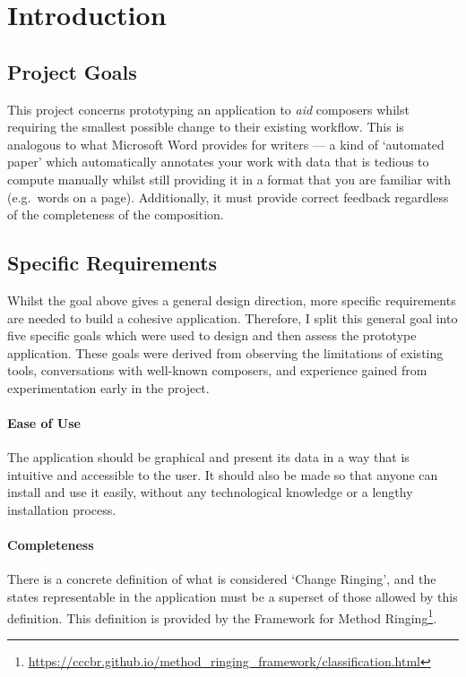 \documentclass[12pt]{article}
\newcommand{\footurl}[1]{\footnote{\url{#1}}}
\begin{document}
\pagebreak

\section{Introduction}

\subsection{Project Goals}\label{sec:design-goals}

This project concerns prototyping an application to \emph{aid} composers whilst requiring the
smallest possible change to their existing workflow.  This is analogous to what Microsoft Word
provides for writers --- a kind of `automated paper' which automatically annotates your work with
data that is tedious to compute manually whilst still providing it in a format that you are familiar
with (e.g.\ words on a page).  Additionally, it must provide correct feedback regardless of the
completeness of the composition.

\subsection{Specific Requirements}\label{sec:requirements}

Whilst the goal above gives a general design direction, more specific requirements are needed to
build a cohesive application.  Therefore, I split this general goal into five specific goals which
were used to design and then assess the prototype application.  These goals were derived from
observing the limitations of existing tools, conversations with well-known composers, and experience
gained from experimentation early in the project.  

\paragraph{Ease of Use} The application should be graphical and present its data in a way that is
intuitive and accessible to the user.  It should also be made so that anyone can install and use it
easily, without any technological knowledge or a lengthy installation process.

\paragraph{Completeness} There is a concrete definition of what is considered `Change
Ringing', and the states representable in the application must be a superset of those allowed by
this definition.  This definition is provided by the Framework for Method
Ringing\footurl{https://cccbr.github.io/method_ringing_framework/classification.html}.
\end{document}

